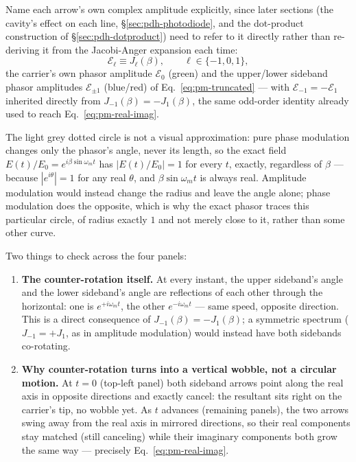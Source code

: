 \documentclass[9pt]{article}
\begin{document}
Name each arrow's own complex amplitude explicitly, since later sections
(the cavity's effect on each line, \S\ref{sec:pdh-photodiode}, and the
dot-product construction of \S\ref{sec:pdh-dotproduct}) need to refer to it
directly rather than re-deriving it from the Jacobi-Anger expansion each
time:
\begin{equation}
\mathcal{E}_\ell \equiv J_\ell(\beta), \qquad \ell\in\{-1,0,1\},
\label{eq:sidebands-phasor-amplitude}
\end{equation}
the carrier's own phasor amplitude $\mathcal{E}_0$ (green) and the
upper/lower sideband phasor amplitudes $\mathcal{E}_{\pm1}$ (blue/red) of
Eq.~\eqref{eq:pm-truncated} --- with $\mathcal{E}_{-1}=-\mathcal{E}_1$
inherited directly from $J_{-1}(\beta)=-J_1(\beta)$, the same odd-order
identity already used to reach Eq.~\eqref{eq:pm-real-imag}.

The light grey dotted circle is not a visual approximation: pure phase
modulation changes only the phasor's angle, never its length, so the exact
field $E(t)/E_0=e^{i\beta\sin\omega_m t}$ has $|E(t)/E_0|=1$ for every $t$,
exactly, regardless of $\beta$ --- because $|e^{i\theta}|=1$ for any real
$\theta$, and $\beta\sin\omega_m t$ is always real. Amplitude modulation
would instead change the radius and leave the angle alone; phase modulation
does the opposite, which is why the exact phasor traces this particular
circle, of radius exactly $1$ and not merely close to it, rather than some
other curve.

Two things to check across the four panels:

\begin{enumerate}
\item \textbf{The counter-rotation itself.} At every instant, the upper
sideband's angle and the lower sideband's angle are reflections of each
other through the horizontal: one is $e^{+i\omega_m t}$, the other
$e^{-i\omega_m t}$ --- same speed, opposite direction. This is a direct
consequence of $J_{-1}(\beta)=-J_1(\beta)$; a symmetric spectrum
($J_{-1}=+J_1$, as in amplitude modulation) would instead have both
sidebands co-rotating.
\item \textbf{Why counter-rotation turns into a vertical wobble, not a
circular motion.} At $t=0$ (top-left panel) both sideband arrows point along
the real axis in opposite directions and exactly cancel: the resultant sits
right on the carrier's tip, no wobble yet. As $t$ advances (remaining
panels), the two arrows swing away from the real axis in mirrored
directions, so their real components stay matched (still canceling) while
their imaginary components both grow the same way --- precisely
Eq.~\eqref{eq:pm-real-imag}.
\end{enumerate}
\end{document}
